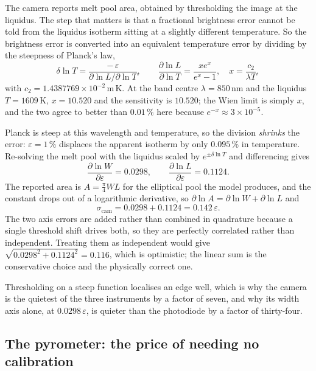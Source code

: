 \documentclass[preprint,12pt]{elsarticle}
\begin{document}
The camera reports melt pool area, obtained by thresholding the image at the
liquidus. The step that matters is that a fractional brightness error cannot be
told from the liquidus isotherm sitting at a slightly different temperature. So
the brightness error is converted into an equivalent temperature error by
dividing by the steepness of Planck's law,
%
\begin{equation}
\delta \ln T = \frac{-\,\varepsilon}{\partial \ln L / \partial \ln T},
\qquad
\frac{\partial \ln L}{\partial \ln T} = \frac{x e^{x}}{e^{x}-1},
\quad x = \frac{c_2}{\lambda T},
\label{eq:planck}
\end{equation}
%
with $c_2 = 1.4387769\times 10^{-2}$\,m\,K. At the band centre
$\lambda = 850$\,nm and the liquidus $T = 1609$\,K, $x = 10.520$ and the
sensitivity is $10.520$; the Wien limit is simply $x$, and the two agree to
better than $0.01\,\%$ here because $e^{-x} \approx 3\times10^{-5}$.

Planck is steep at this wavelength and temperature, so the division
\emph{shrinks} the error: $\varepsilon = 1\,\%$ displaces the apparent isotherm
by only $0.095\,\%$ in temperature. Re-solving the melt pool with the liquidus
scaled by $e^{\pm\delta \ln T}$ and differencing gives
%
\begin{equation}
\frac{\partial \ln W}{\partial \varepsilon} = 0.0298 ,
\qquad
\frac{\partial \ln L}{\partial \varepsilon} = 0.1124 .
\end{equation}
%
The reported area is $A = \tfrac{\pi}{4} W L$ for the elliptical pool the model
produces, and the constant drops out of a logarithmic derivative, so
$\partial \ln A = \partial \ln W + \partial \ln L$ and
%
\begin{equation}
\sigma_{\mathrm{cam}} = 0.0298 + 0.1124 = 0.142\,\varepsilon .
\end{equation}
%
The two axis errors are added rather than combined in quadrature because a
single threshold shift drives both, so they are perfectly correlated rather than
independent. Treating them as independent would give
$\sqrt{0.0298^2 + 0.1124^2} = 0.116$, which is optimistic; the linear sum is the
conservative choice and the physically correct one.

Thresholding on a steep function localises an edge well, which is why the camera
is the quietest of the three instruments by a factor of seven, and why its width
axis alone, at $0.0298\,\varepsilon$, is quieter than the photodiode by a factor
of thirty-four.

\subsection{The pyrometer: the price of needing no calibration}
\end{document}
